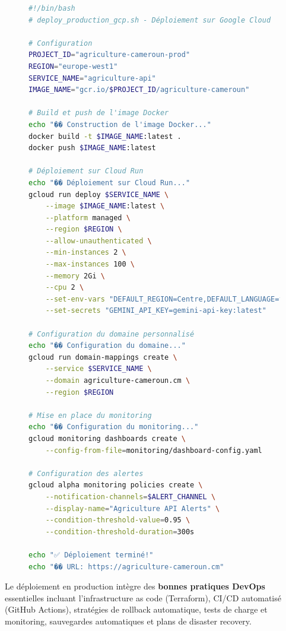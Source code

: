 \begin{figure}[H]
\centering
\begin{lstlisting}[language=bash, caption=Script de déploiement production (GCP)]
#!/bin/bash
# deploy_production_gcp.sh - Déploiement sur Google Cloud

# Configuration
PROJECT_ID="agriculture-cameroun-prod"
REGION="europe-west1"
SERVICE_NAME="agriculture-api"
IMAGE_NAME="gcr.io/$PROJECT_ID/agriculture-cameroun"

# Build et push de l'image Docker
echo "��️ Construction de l'image Docker..."
docker build -t $IMAGE_NAME:latest .
docker push $IMAGE_NAME:latest

# Déploiement sur Cloud Run
echo "�� Déploiement sur Cloud Run..."
gcloud run deploy $SERVICE_NAME \
    --image $IMAGE_NAME:latest \
    --platform managed \
    --region $REGION \
    --allow-unauthenticated \
    --min-instances 2 \
    --max-instances 100 \
    --memory 2Gi \
    --cpu 2 \
    --set-env-vars "DEFAULT_REGION=Centre,DEFAULT_LANGUAGE=fr" \
    --set-secrets "GEMINI_API_KEY=gemini-api-key:latest"

# Configuration du domaine personnalisé
echo "�� Configuration du domaine..."
gcloud run domain-mappings create \
    --service $SERVICE_NAME \
    --domain agriculture-cameroun.cm \
    --region $REGION

# Mise en place du monitoring
echo "�� Configuration du monitoring..."
gcloud monitoring dashboards create \
    --config-from-file=monitoring/dashboard-config.yaml

# Configuration des alertes
gcloud alpha monitoring policies create \
    --notification-channels=$ALERT_CHANNEL \
    --display-name="Agriculture API Alerts" \
    --condition-threshold-value=0.95 \
    --condition-threshold-duration=300s

echo "✅ Déploiement terminé!"
echo "�� URL: https://agriculture-cameroun.cm"
\end{lstlisting}
\end{figure}

Le déploiement en production intègre des \textbf{bonnes pratiques DevOps} essentielles incluant l'infrastructure as code (Terraform), CI/CD automatisé (GitHub Actions), stratégies de rollback automatique, tests de charge et monitoring, sauvegardes automatiques et plans de disaster recovery.

